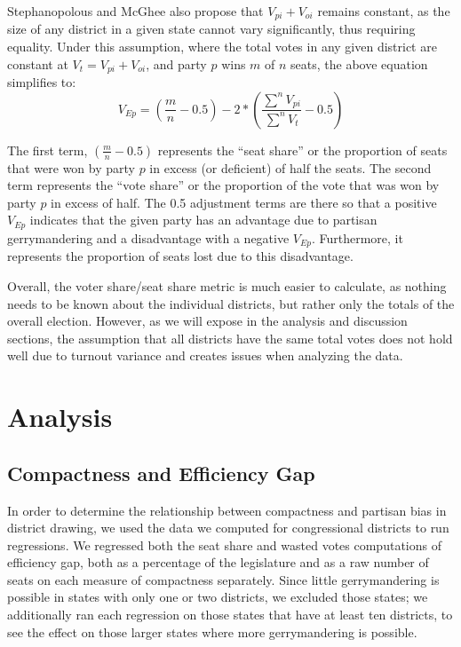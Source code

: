 \documentclass[12pt]{article}
\begin{document}
     Stephanopolous and McGhee also propose that $V_{pi}+V_{oi}$ remains constant, as the size of any district in a given state cannot vary significantly, thus requiring equality.  Under this assumption, where the total votes in any given district are constant at $V_{t} = V_{pi}+V_{oi}$, and party $p$ wins $m$ of $n$ seats, the above equation simplifies to:
     \[V_{Ep} = \left(\frac{m}{n}-0.5\right) - 2*\left(\frac{\sum^{n}V_{pi}}{\sum^n{V_t}}-0.5\right)\]

  The first term, $\left(\frac{m}{n}-0.5\right)$ represents the ``seat share'' or the proportion of seats that were won by party $p$ in excess (or deficient) of half the seats.  The second term represents the ``vote share'' or the proportion of the vote that was won by party $p$ in excess of half. The 0.5 adjustment terms are there so that a positive $V_{Ep}$ indicates that the given party has an advantage due to partisan gerrymandering and a disadvantage with a negative $V_{Ep}$.  Furthermore, it represents the proportion of seats lost due to this disadvantage.

  Overall, the voter share/seat share metric is much easier to calculate, as nothing needs to be known about the individual districts, but rather only the totals of the overall election.  However, as we will expose in the analysis and discussion sections, the assumption that all districts have the same total votes does not hold well due to turnout variance and creates issues when analyzing the data.


  \section{Analysis}

  \subsection{Compactness and Efficiency Gap}

  In order to determine the relationship between compactness and partisan bias in district drawing, we used the data we computed for congressional districts to run regressions.  We regressed both the seat share and wasted votes computations of efficiency gap, both as a percentage of the legislature and as a raw number of seats on each measure of compactness separately.  Since little gerrymandering is possible in states with only one or two districts, we excluded those states; we additionally ran each regression on those states that have at least ten districts, to see the effect on those larger states where more gerrymandering is possible.
\end{document}
